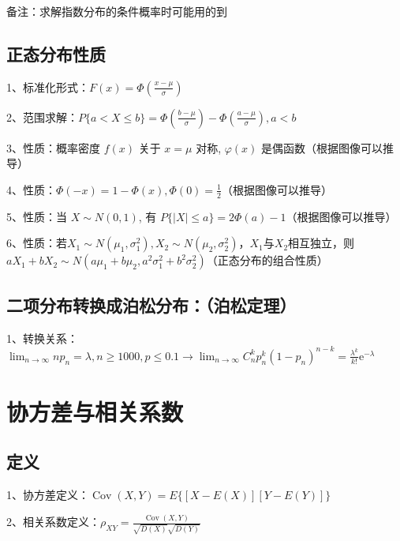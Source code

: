 备注：求解指数分布的条件概率时可能用的到



\subsection{正态分布性质}

1、标准化形式：$F(x)=\Phi\left(\frac{x-\mu}{\sigma}\right)$

2、范围求解：$P\{a<X \leqslant b\}=\Phi\left(\frac{b-\mu}{\sigma}\right)-\Phi\left(\frac{a-\mu}{\sigma}\right), a<b$

3、性质：概率密度 $f(x)$ 关于 $x=\mu$ 对称, $\varphi(x)$ 是偶函数（根据图像可以推导）

4、性质：$\Phi(-x)=1-\Phi(x), \Phi(0)=\frac{1}{2}$（根据图像可以推导）

5、性质：当 $X \sim N(0,1)$, 有 $P\{|X| \leqslant a\}=2 \Phi(a)-1$（根据图像可以推导）

6、性质：若$X_{1} \sim N\left(\mu_{1}, \sigma_{1}^{2}\right), X_{2} \sim N\left(\mu_{2}, \sigma_{2}^{2}\right)$，$X_{1}$与$X_{2}$相互独立，则$a X_{1}+b X_{2} \sim N\left(a \mu_{1}+b \mu_{2}, a^{2} \sigma_{1}^{2}+b^{2} \sigma_{2}^{2}\right)$（正态分布的组合性质）



\subsection{二项分布转换成泊松分布：（泊松定理）}

1、转换关系：$\lim_{n \rightarrow \infty}np_n=\lambda, n\ge1000,p\le0.1 \rightarrow \lim _{n \rightarrow \infty} C_{n}^{k} p_{n}^{k}\left(1-p_{n}\right)^{n-k}=\frac{\lambda^{k}}{k !} \mathrm{e}^{-\lambda}$

\section{协方差与相关系数}



\subsection{定义}

1、协方差定义：$\operatorname{Cov}(X, Y)=E\{[X-E(X)][Y-E(Y)]\}$

2、相关系数定义：$\rho_{X Y}=\frac{\operatorname{Cov}(X, Y)}{\sqrt{D(X)} \sqrt{D(Y)}}$



